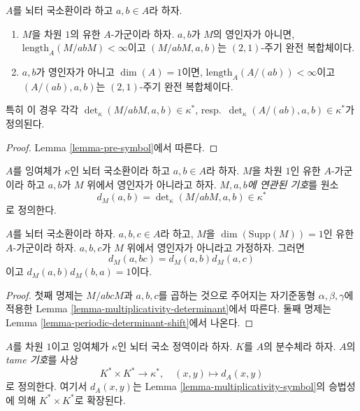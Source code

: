\begin{lemma}
\label{lemma-symbol-defined}
$A$를 뇌터 국소환이라 하고 $a, b \in A$라 하자.
\begin{enumerate}
\item $M$을 차원 $1$의 유한 $A$-가군이라 하자.
$a, b$가 $M$의 영인자가 아니면, $\text{length}_A(M/abM) < \infty$이고
$(M/abM, a, b)$는 $(2, 1)$-주기 완전 복합체이다.
\item $a, b$가 영인자가 아니고 $\dim(A) = 1$이면,
$\text{length}_A(A/(ab)) < \infty$이고
$(A/(ab), a, b)$는 $(2, 1)$-주기 완전 복합체이다.
\end{enumerate}
특히 이 경우 각각
$\det_\kappa(M/abM, a, b) \in \kappa^*$,
resp.\ $\det_\kappa(A/(ab), a, b) \in \kappa^*$가 정의된다.
\end{lemma}

\begin{proof}
Lemma \ref{lemma-pre-symbol}에서 따른다.
\end{proof}

\begin{definition}
\label{definition-symbol-M}
$A$를 잉여체가 $\kappa$인 뇌터 국소환이라 하고 $a, b \in A$라
하자. $M$을 차원 $1$인 유한 $A$-가군이라 하고 $a, b$가 $M$ 위에서
영인자가 아니라고 하자. {\it $M, a, b$에 연관된 기호}를 원소
$$
d_M(a, b) =
\det\nolimits_\kappa(M/abM, a, b) \in \kappa^*
$$
로 정의한다.
\end{definition}

\begin{lemma}
\label{lemma-multiplicativity-symbol}
$A$를 뇌터 국소환이라 하자. $a, b, c \in A$라 하고,
$M$을 $\dim(\text{Supp}(M)) = 1$인 유한 $A$-가군이라 하자.
$a, b, c$가 $M$ 위에서 영인자가 아니라고 가정하자. 그러면
$$
d_M(a, bc) = d_M(a, b) d_M(a, c)
$$
이고 $d_M(a, b)d_M(b, a) = 1$이다.
\end{lemma}

\begin{proof}
첫째 명제는 $M/abcM$과 $a, b, c$를 곱하는 것으로 주어지는
자기준동형 $\alpha, \beta, \gamma$에 적용한 Lemma
\ref{lemma-multiplicativity-determinant}에서 따른다.
둘째 명제는 Lemma \ref{lemma-periodic-determinant-shift}에서 나온다.
\end{proof}

\begin{definition}
\label{definition-tame-symbol}
$A$를 차원 $1$이고 잉여체가 $\kappa$인 뇌터 국소 정역이라 하자.
$K$를 $A$의 분수체라 하자. $A$의 {\it tame 기호}를 사상
$$
K^* \times K^* \longrightarrow \kappa^*,
\quad
(x, y) \longmapsto d_A(x, y)
$$
로 정의한다. 여기서 $d_A(x, y)$는 Lemma
\ref{lemma-multiplicativity-symbol}의 승법성에 의해
$K^* \times K^*$로 확장된다.
\end{definition}


